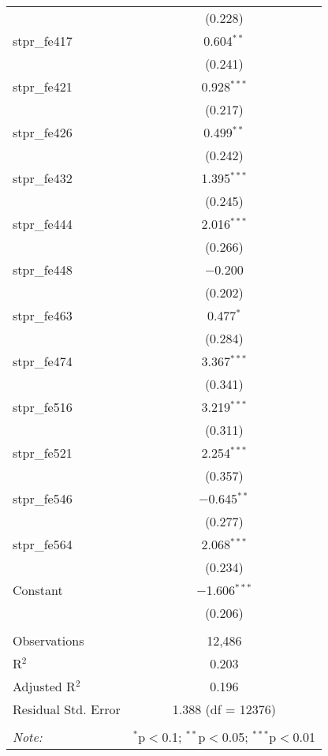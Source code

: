 \begin{table}[!htbp]
\begin{tabular}{@{\extracolsep{5pt}}lc}
  & (0.228) \\ 
  stpr\_fe417 & 0.604$^{**}$ \\ 
  & (0.241) \\ 
  stpr\_fe421 & 0.928$^{***}$ \\ 
  & (0.217) \\ 
  stpr\_fe426 & 0.499$^{**}$ \\ 
  & (0.242) \\ 
  stpr\_fe432 & 1.395$^{***}$ \\ 
  & (0.245) \\ 
  stpr\_fe444 & 2.016$^{***}$ \\ 
  & (0.266) \\ 
  stpr\_fe448 & $-$0.200 \\ 
  & (0.202) \\ 
  stpr\_fe463 & 0.477$^{*}$ \\ 
  & (0.284) \\ 
  stpr\_fe474 & 3.367$^{***}$ \\ 
  & (0.341) \\ 
  stpr\_fe516 & 3.219$^{***}$ \\ 
  & (0.311) \\ 
  stpr\_fe521 & 2.254$^{***}$ \\ 
  & (0.357) \\ 
  stpr\_fe546 & $-$0.645$^{**}$ \\ 
  & (0.277) \\ 
  stpr\_fe564 & 2.068$^{***}$ \\ 
  & (0.234) \\ 
  Constant & $-$1.606$^{***}$ \\ 
  & (0.206) \\ 
 \hline \\[-1.8ex] 
Observations & 12,486 \\ 
R$^{2}$ & 0.203 \\ 
Adjusted R$^{2}$ & 0.196 \\ 
Residual Std. Error & 1.388 (df = 12376) \\ 
\hline 
\hline \\[-1.8ex] 
\textit{Note:}  & \multicolumn{1}{r}{$^{*}$p$<$0.1; $^{**}$p$<$0.05; $^{***}$p$<$0.01} \\ 
\end{tabular} 
\end{table} 
